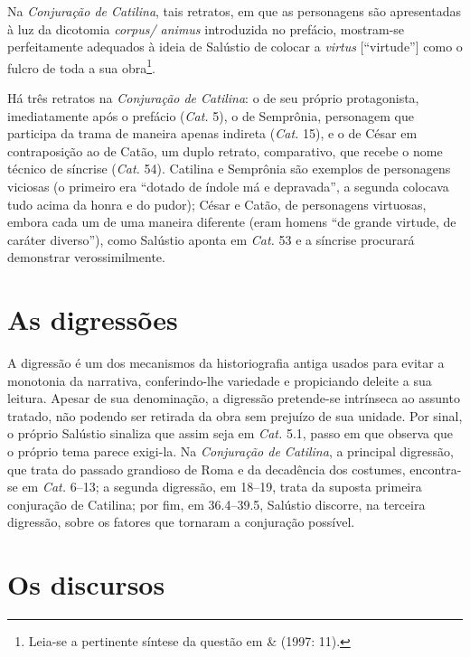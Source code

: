 Na \emph{Conjuração de Catilina}, tais retratos, em que as personagens são
apresentadas à luz da dicotomia \emph{corpus/ animus} introduzida no prefácio,
mostram-se perfeitamente adequados à ideia de Salústio de colocar a
\emph{virtus} [“virtude”] como o fulcro de toda a sua obra\footnote{Leia-se a pertinente síntese da questão em  \& (1997: 11).}.  

Há três retratos na \emph{Conjuração de Catilina}: o de seu próprio
protagonista, imediatamente após o prefácio (\emph{Cat.} 5), o de Semprônia, personagem
que participa da trama de maneira apenas indireta (\emph{Cat.} 15), e o de César em
contraposição ao de Catão, um duplo retrato, comparativo, que recebe o nome
técnico de síncrise (\emph{Cat.} 54). Catilina e Semprônia são exemplos de personagens
viciosas (o primeiro era “dotado de índole má e depravada”, a segunda colocava
tudo acima da honra e do pudor); César e Catão, de personagens virtuosas,
embora cada um de uma maneira diferente (eram homens “de grande virtude, de
caráter diverso”), como Salústio aponta em \emph{Cat.} 53 e a síncrise procurará
demonstrar verossimilmente.

\section{As digressões}

A digressão é um dos mecanismos da historiografia antiga usados para evitar a
monotonia da narrativa, conferindo-lhe variedade e propiciando deleite a sua
leitura. Apesar de sua denominação, a digressão pretende-se intrínseca ao assunto tratado, não podendo ser retirada da
obra sem prejuízo de sua unidade. Por sinal, o próprio Salústio sinaliza que
assim seja em \emph{Cat.} 5.1, passo em que observa que o próprio tema parece exigi-la. Na
\emph{Conjuração de Catilina}, a principal digressão, que trata do passado
grandioso de Roma e da decadência dos costumes, encontra-se em \emph{Cat.} 6--13;
a segunda digressão, em 18--19, trata da suposta primeira conjuração de
Catilina; por fim, em 36.4--39.5, Salústio discorre, na terceira digressão,
sobre os fatores que tornaram a conjuração possível. 

\section{Os discursos}
 
